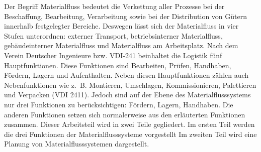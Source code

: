 \begin{itemize}
Der Begriff Materialfluss bedeutet die Verkettung aller Prozesse bei der Beschaffung, Bearbeitung, Verarbeitung sowie bei der Distribution von G\"utern innerhalb festgelegter Bereiche.
Deswegen l\"asst sich der Materialfluss in vier Stufen unterordnen: externer Transport, betriebsinterner Materialfluss, geb\"audeinterner Materialfluss und Materialfluss am Arbeitsplatz.
Nach dem Verein Deutscher Ingenieure bzw. VDI-241 beinhaltet die Logistik f\"unf Hauptfunktionen.
Diese Funktionen sind Bearbeiten, Pr\"ufen, Handhaben, F\"ordern, Lagern und Aufenthalten.
Neben diesen Hauptfunktionen z\"ahlen auch Nebenfunktionen wie z.~B. Montieren, Umschlagen, Kommissionieren, Palettieren und Verpacken (VDI 2411).
Jedoch sind auf der Ebene des Materialflusssystems nur drei Funktionen zu ber\"ucksichtigen: F\"ordern, Lagern, Handhaben.
Die anderen Funktionen setzen sich normalerweise aus den erl\"auterten Funktionen zusammen.
Dieser Arbeitsteil wird in zwei Teile gegliedert.
Im ersten Teil werden die drei Funktionen der Materialflusssysteme vorgestellt Im zweiten Teil wird eine Planung von Materialflusssystemen dargestellt.


\end{itemize}
